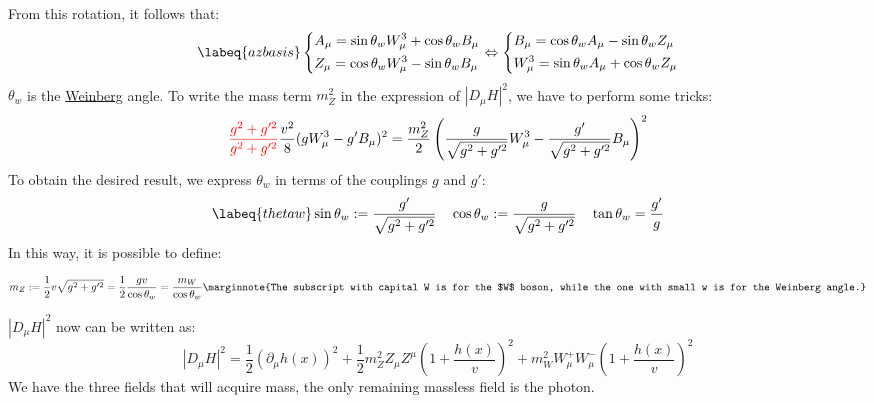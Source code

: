 \documentclass[../main.tex]{subfiles}
\begin{document}
From this rotation, it follows that:
\begin{equation}
\labeq{azbasis}
\left\{
\begin{aligned}
&A_\mu=\sin\theta_wW_\mu^3+\cos\theta_wB_\mu\\
&Z_\mu=\cos\theta_wW_\mu^3-\sin\theta_wB_\mu
\end{aligned}
\right.
\Leftrightarrow
\left\{
\begin{aligned}
&B_\mu=\cos\theta_wA_\mu-\sin\theta_wZ_\mu\\
&W_\mu^3=\sin\theta_wA_\mu+\cos\theta_wZ_\mu
\end{aligned}
\right.
\end{equation}
$\theta_w$ is the \href{https://en.wikipedia.org/wiki/Steven_Weinberg}{Weinberg} angle. To write the mass term $m_Z^2$ in the expression of $|D_\mu H|^2$, we have to perform some tricks:
\[
{\color{red}\frac{g^2+g'^2}{g^2+g'^2}}\frac{v^2}{8}(gW_\mu^3-g'B_\mu)^2=\frac{m_Z^2}{2}\left(\frac{g}{\sqrt{g^2+g'^2}}W_\mu^3-\frac{g'}{\sqrt{g^2+g'^2}}B_\mu\right)^2
\]
To obtain the desired result, we express $\theta_w$ in terms of the couplings $g$ and $g'$:
\begin{equation}
\labeq{thetaw}  
\sin\theta_w:=\frac{g'}{\sqrt{g^2+g'^2}} \quad \cos\theta_w:=\frac{g}{\sqrt{g^2+g'^2}} \quad \tan\theta_w=\frac{g'}{g}
\end{equation}
In this way, it is possible to define:
\begin{kaobox}[frametitle=Mass of the $Z$ boson]
\[
m_Z:=\frac{1}{2}v\sqrt{g^2+g'^2}=\frac{1}{2}\frac{gv}{\cos\theta_w}=\frac{m_W}{\cos\theta_w}\marginnote{The subscript with capital W is for the $W$ boson, while the one with small w is for the Weinberg angle.}
\]    
\end{kaobox}
$|D_\mu H|^2$ now can be written as:
\[
|D_\mu H|^2=\frac{1}{2}(\partial_\mu h(x))^2+\frac{1}{2}m_Z^2Z_\mu Z^\mu\left(1+\frac{h(x)}{v}\right)^2+m_W^2W_\mu^+W_\mu^-\left(1+\frac{h(x)}{v}\right)^2
\]
We have the three fields that will acquire mass, the only remaining massless field is the photon. 
\end{document}

